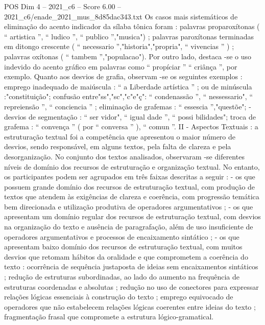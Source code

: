 \begin{textsample}{POS Dim 4 – 2021\_c6 – Score 6.00 – 2021\_c6/enade\_2021\_mus\_8d85dac343.txt}
Os casos mais sistemáticos de eliminação do acento indicador da sílaba tônica foram : palavras proparoxítonas ( “ artistica ”, “ ludico ”, “ publico ”,"musica") ; palavras paroxítonas terminadas em ditongo crescente ( “ necessario ”,"historia","propria", “ vivencias ” ) ; palavras oxítonas ( “ tambem ”,"populacao").
Por outro lado, destaca -se o uso indevido do acento gráfico em palavras como “ propíciar ” “ criânça ”, por exemplo.
Quanto aos desvios de grafia, observam -se os seguintes exemplos : emprego inadequado de maiúscula : “ a Liberdade artística ” ; ou de minúscula :"constituição"; confusão entre"ss","sc","c"e"ç": “ condenassão ”, “ nessessario", “ repreiensão ”, “ conciencia ” ; eliminação de grafemas : “ essescia ”,"questõe"; - desvios de segmentação : “ ser vidor", “ igual dade ”, “ possi bilidades"; troca de grafema : “ convença ” ( por “ conversa ” ), “ comun ”.
II - Aspectos Textuais : a estruturação textual foi a competência que apresentou o maior número de desvios, sendo responsável, em alguns textos, pela falta de clareza e pela desorganização.
No conjunto dos textos analisados, observaram -se diferentes níveis de domínio dos recursos de estruturação e organização textual.
No entanto, os participantes podem ser agrupados em três faixas descritas a seguir : - os que possuem grande domínio dos recursos de estruturação textual, com produção de textos que atendem às exigências de clareza e coerência, com progressão temática bem direcionada e utilização produtiva de operadores argumentativos ; - os que apresentam um domínio regular dos recursos de estruturação textual, com desvios na organização do texto e ausência de paragrafação, além de uso insuficiente de operadores argumentativos e processos de encaixamento sintático ; - os que apresentam baixo domínio dos recursos de estruturação textual, com muitos desvios que retomam hábitos da oralidade e que comprometem a coerência do texto : ocorrência de sequência justaposta de ideias sem encaixamentos sintáticos ; redução de estruturas subordinadas, ao lado do aumento na frequência de estruturas coordenadas e absolutas ; redução no uso de conectores para expressar relações lógicas essenciais à construção do texto ; emprego equivocado de operadores que não estabelecem relações lógicas coerentes entre ideias do texto ; fragmentação frasal que compromete a estrutura lógico-gramatical.

\end{textsample}
